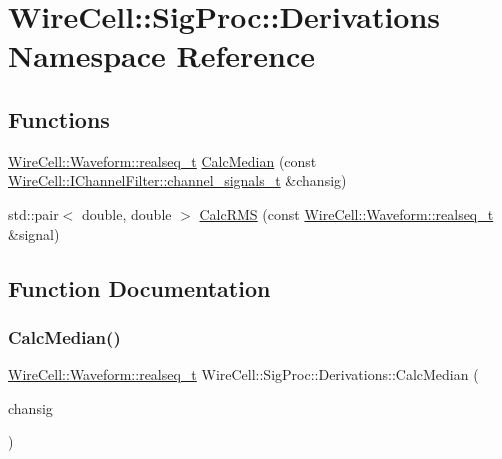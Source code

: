 \hypertarget{namespace_wire_cell_1_1_sig_proc_1_1_derivations}{}\section{Wire\+Cell\+:\+:Sig\+Proc\+:\+:Derivations Namespace Reference}
\label{namespace_wire_cell_1_1_sig_proc_1_1_derivations}
\subsection*{Functions}
\begin{DoxyCompactItemize}
\item 
\hyperlink{namespace_wire_cell_1_1_waveform_a479175e541c8545e87cd8063b74b6956}{Wire\+Cell\+::\+Waveform\+::realseq\+\_\+t} \hyperlink{namespace_wire_cell_1_1_sig_proc_1_1_derivations_a162c77ac9d9ea28303c9a0c843e052a8}{Calc\+Median} (const \hyperlink{class_wire_cell_1_1_i_channel_filter_a44de35ce47701d84cd45393c6bcd5e2f}{Wire\+Cell\+::\+I\+Channel\+Filter\+::channel\+\_\+signals\+\_\+t} \&chansig)
\item 
std\+::pair$<$ double, double $>$ \hyperlink{namespace_wire_cell_1_1_sig_proc_1_1_derivations_a3119f257567050bd02427bbcd2cd3a7b}{Calc\+R\+MS} (const \hyperlink{namespace_wire_cell_1_1_waveform_a479175e541c8545e87cd8063b74b6956}{Wire\+Cell\+::\+Waveform\+::realseq\+\_\+t} \&signal)
\end{DoxyCompactItemize}


\subsection{Function Documentation}
\mbox{\label{namespace_wire_cell_1_1_sig_proc_1_1_derivations_a162c77ac9d9ea28303c9a0c843e052a8}} 
\subsubsection{\texorpdfstring{Calc\+Median()}{CalcMedian()}}
{\footnotesize\ttfamily \hyperlink{namespace_wire_cell_1_1_waveform_a479175e541c8545e87cd8063b74b6956}{Wire\+Cell\+::\+Waveform\+::realseq\+\_\+t} Wire\+Cell\+::\+Sig\+Proc\+::\+Derivations\+::\+Calc\+Median (\begin{DoxyParamCaption}\item[{const \hyperlink{class_wire_cell_1_1_i_channel_filter_a44de35ce47701d84cd45393c6bcd5e2f}{Wire\+Cell\+::\+I\+Channel\+Filter\+::channel\+\_\+signals\+\_\+t} \&}]{chansig }\end{DoxyParamCaption})}


